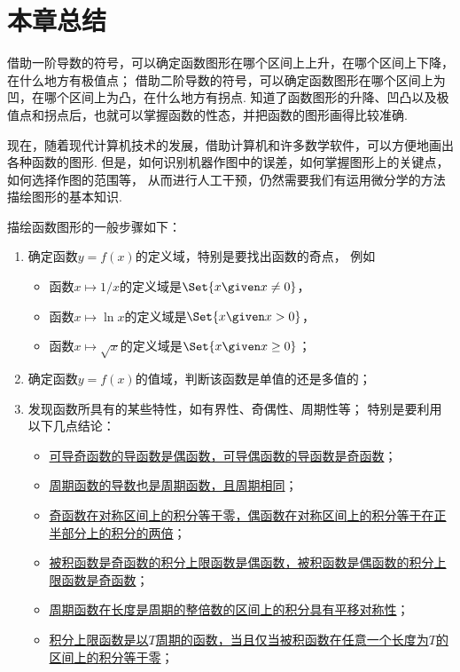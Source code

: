 \section{本章总结}
借助一阶导数的符号，可以确定函数图形在哪个区间上上升，在哪个区间上下降，在什么地方有极值点；
借助二阶导数的符号，可以确定函数图形在哪个区间上为凹，在哪个区间上为凸，在什么地方有拐点.
知道了函数图形的升降、凹凸以及极值点和拐点后，也就可以掌握函数的性态，并把函数的图形画得比较准确.

现在，随着现代计算机技术的发展，借助计算机和许多数学软件，可以方便地画出各种函数的图形.
但是，如何识别机器作图中的误差，如何掌握图形上的关键点，如何选择作图的范围等，
从而进行人工干预，仍然需要我们有运用微分学的方法描绘图形的基本知识.

描绘函数图形的一般步骤如下：\begin{enumerate}
	\item 确定函数\(y=f(x)\)的定义域，特别是要找出函数的奇点，
	例如\begin{itemize}
		\item 函数\(x \mapsto 1/x\)的定义域是\(\Set{ x \given x\neq0 }\)，
		\item 函数\(x \mapsto \ln x\)的定义域是\(\Set{ x \given x>0 }\)，
		\item 函数\(x \mapsto \sqrt{x}\)的定义域是\(\Set{ x \given x\geq0 }\)；
	\end{itemize}

	\item 确定函数\(y=f(x)\)的值域，判断该函数是单值的还是多值的；

	\item 发现函数所具有的某些特性，如有界性、奇偶性、周期性等；
	特别是要利用以下几点结论：\begin{itemize}
		\item \hyperref[theorem:导数与微分.导函数的奇偶性]{可导奇函数的导函数是偶函数，可导偶函数的导函数是奇函数}；
		\item \hyperref[theorem:导数与微分.导函数的周期性]{周期函数的导数也是周期函数，且周期相同}；
		\item \hyperref[theorem:定积分.利用对称性简化计算1]{奇函数在对称区间上的积分等于零，偶函数在对称区间上的积分等于在正半部分上的积分的两倍}；
		\item \hyperref[theorem:定积分.积分上限函数的奇偶性]{被积函数是奇函数的积分上限函数是偶函数，被积函数是偶函数的积分上限函数是奇函数}；
		\item \hyperref[theorem:定积分.周期函数的积分]{周期函数在长度是周期的整倍数的区间上的积分具有平移对称性}；
		\item \hyperref[example:定积分.积分上限函数是周期函数的充分必要条件]{积分上限函数是以\(T\)周期的函数，当且仅当被积函数在任意一个长度为\(T\)的区间上的积分等于零}；
	\end{itemize}


\end{enumerate}
